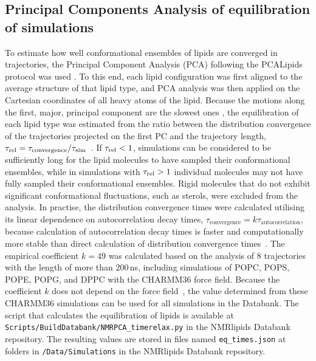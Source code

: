 \documentclass[fleqn,10pt]{wlscirep}
\begin{document}
\subsection{Principal Components Analysis of equilibration of simulations}
To estimate how well conformational ensembles of lipids are converged in trajectories, the Principal Component Analysis (PCA) following the PCALipids protocol was used \cite{buslaev16,buslaev2020principal}. To this end, each lipid configuration was first aligned to the average structure of that lipid type, and PCA analysis was then applied on the Cartesian coordinates of all heavy atoms of the lipid. Because the motions along the first, major, principal component are the slowest ones \cite{buslaev16}, the equilibration of each lipid type was estimated from the ratio between the distribution convergence of the trajectories projected on the first PC and the trajectory length, $\tau_{\rm rel} = \tau_{\text{convergence}}/\tau_{\text{sim}}$~\cite{buslaev16, buslaev2020principal}. If $\tau_{\rm rel} < 1$, simulations can be considered to be sufficiently long for the lipid molecules to have sampled their conformational ensembles, while in simulations with $\tau_{\rm rel} > 1$ individual molecules may not have fully sampled their conformational ensembles. Rigid molecules that do not exhibit significant conformational fluctuations, such as sterols, were excluded from the analysis. In practise, the distribution convergence times were calculated utilising its linear dependence on autocorrelation decay times,
    $\tau_{\text{convergence}} = k\tau_{\text{autocorrelation}}$,
because calculation of autocorrelation decay times is faster and computationally more stable than direct calculation of distribution convergence times~\cite{buslaev16, buslaev2020principal}. The empirical coefficient $k = 49$ was calculated based on the analysis of 8 trajectories with the length of more than 200\,ns, including simulations of POPC, POPS, POPE, POPG, and DPPC with the CHARMM36 force field. Because the coefficient $k$ does not depend on the force field~\cite{buslaev16}, the value determined from these CHARMM36 simulations can be used for all simulations in the Databank. The script that calculates the equilibration of lipids is available at \texttt{Scripts/BuildDatabank/NMRPCA\_timerelax.py} in the NMRlipids Databank repository. The resulting values are stored in files named \texttt{eq\_times.json} at folders in \texttt{/Data/Simulations} in the NMRlipids Databank repository. 
\end{document}
